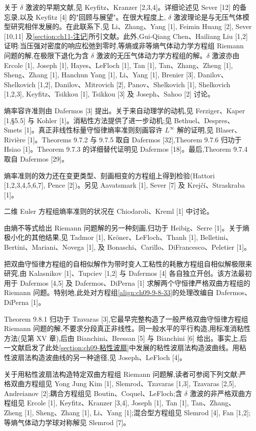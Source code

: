 \documentclass[../../main.tex]{subfiles}
\begin{document}
关于 $\delta$ 激波的早期文献,见 Keyfitz、Kranzer [2,3,4]。详细论述见 Sever [12] 的备忘录,以及 Keyfitz [4] 的"回顾与展望"。在很大程度上, $\delta$ 激波理论是与无压气体模型研究相伴发展的。在此联系下,见 Li、Zhang、Yang [1], Feimin Huang [2], Sever [10,11] 及\cref{section:ch11-注记}所引文献。此外,Gui-Qiang Chen、Hailiang Liu [1,2] 证明:当压强对密度的响应松弛到零时,等熵或非等熵气体动力学方程组 Riemann 问题的解,在极限下退化为含 $\delta$ 激波的无压气体动力学方程组的解。$\delta$ 激波亦由 Ercole [1], Joseph [1], Hayes、LeFloch [1], Tan [1], Tan、Zhang、Zheng [1], Sheng、Zhang [1], Hanchun Yang [1], Li、Yang [1], Brenier [3], Danilov、Shelkovich [1,2], Danilov、Mitrovich [2], Panov、Shelkovich [1], Shelkovich [1,2,3], Keyfitz、Tsikkou [1], Tsikkou [3] 及 Joseph、Sahoo [2] 讨论。

熵率容许准则由 Dafermos [3] 提出。关于来自动理学的动机,见 Ferziger、Kaper [1,\S5.5] 与 Kohler [1]。消粘性方法提供了进一步动机;见 Bethuel、Despres、Smets [1]。真正非线性标量守恒律熵率准则刻画容许 $L^{\infty}$ 解的证明,见 Blaser、Rivière [1]。Theorems 9.7.2 与 9.7.5 取自 Dafermos [32],Theorem 9.7.6 归功于 Hsiao [1]。Theorem 9.7.3 的详细替代证明见 Dafermos [18]。最后,Theorem 9.7.4 取自 Dafermos [29]。

熵率准则的效力还在变更类型、刻画相变的方程组上得到检验(Hattori [1,2,3,4,5,6,7], Pence [2])。另见 Aavatsmark [1], Sever [7] 及 Krejčí、Straskraba [1]。

二维 Euler 方程组熵率准则的状况在 Chiodaroli、Kreml [1] 中讨论。

由熵不等式给出 Riemann 问题解的另一种刻画,归功于 Heibig、Serre [1]。关于熵极小化的其他结果,见 Tadmor [1], Kröner、LeFloch、Thanh [1], Belletini、Bertini、Mariani、Novega [1], 及 Bonaschi、Carillo、DiFrancesco、Peletier [1]。

把双曲守恒律方程组的自相似解作为带时变人工粘性的耗散方程组自相似解极限来研究,由 Kalasnikov [1]、Tupciev [1,2] 与 Dafermos [4] 各自独立开创。该方法最初用于 Dafermos [4,5] 及 Dafermos、DiPerna [1] 求解两个守恒律严格双曲方程组的 Riemann 问题。特别地,此处对方程组\eqref{align:ch09-9-8-33}的处理改编自 Dafermos、DiPerna [1]。

Theorem 9.8.1 归功于 Tzavaras [3],它最早完整构造了一般严格双曲守恒律方程组 Riemann 问题的解,不要求分段真正非线性。同一般水平的平行构造,用标准消粘性方法(见第 XV 章),后由 Bianchini、Bressan [5] 与 Bianchini [6] 给出。事实上,后一文献启发了此处\cref{section:ch09-粘性波扇}中发展的粘性波扇法构造波曲线。用粘性波扇法构造波曲线的另一种途径,见 Joseph、LeFloch [4]。

关于用粘性波扇法构造特定双曲方程组 Riemann 问题解,读者可参阅下列文献:严格双曲方程组见 Yong Jung Kim [1], Slemrod、Tzavaras [1,3], Tzavaras [2,5], Andreianov [2];耦合方程组见 Boutin、Coquel、LeFloch;含 $\delta$ 激波的非严格双曲方程组见 Ercole [1], Keyfitz、Kranzer [3,4], Joseph [1], Tan [1], Tan、Zhang、Zheng [1], Sheng、Zhang [1], Li、Yang [1];混合型方程组见 Slemrod [4], Fan [1,2];等熵气体动力学球对称解见 Slemrod [7]。
\end{document}
